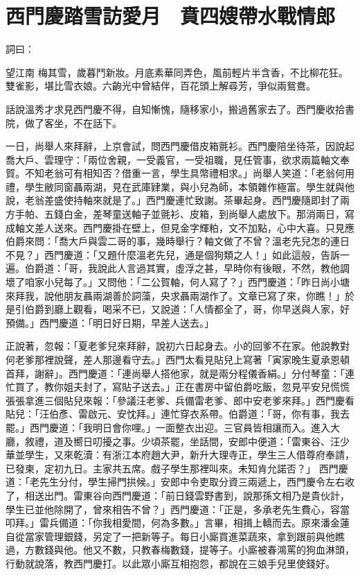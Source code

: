 %

\chapter{西門慶踏雪訪愛月　賁四嫂帶水戰情郎}

\begin{showcontents}{}


詞曰：

望江南
梅其雪，歲暮鬥新妝。月底素華同弄色，風前輕片半含香，不比柳花狂。
雙雀影，堪比雪衣娘。六齣光中曾結伴，百花頭上解尋芳，爭似兩鴛鴦。

話說溫秀才求見西門慶不得，自知慚愧，隨移家小，搬過舊家去了。西門慶收拾書院，做了客坐，不在話下。

一日，尚舉人來拜辭，上京會試，問西門慶借皮箱氈衫。西門慶陪坐待茶，因說起喬大戶、雲理守：「兩位舍親，一受義官，一受祖職，見任管事，欲求兩篇軸文奉賀。不知老翁可有相知否？借重一言，學生具幣禮相求。」尚舉人笑道：「老翁何用禮，學生敝同窗聶兩湖，見在武庫肄業，與小兒為師，本領雜作極富。學生就與他說，老翁差盛使持軸來就是了。」西門慶連忙致謝。茶畢起身。西門慶隨即封了兩方手帕、五錢白金，差琴童送軸子並氈衫、皮箱，到尚舉人處放下。那消兩日，寫成軸文差人送來。西門慶掛在壁上，但見金字輝粕，文不加點，心中大喜。只見應伯爵來問：「喬大戶與雲二哥的事，幾時舉行？軸文做了不曾？溫老先兒怎的連日不見？」西門慶道：「又題什麼溫老先兒，通是個狗類之人！」如此這般，告訴一遍。伯爵道：「哥，我說此人言過其實，虛浮之甚，早時你有後眼，不然，教他調壞了咱家小兒每了。」又問他：「二公賀軸，何人寫了？」西門慶道：「昨日尚小塘來拜我，說他朋友聶兩湖善於詞藻，央求聶兩湖作了。文章已寫了來，你瞧！」於是引伯爵到廳上觀看，喝采不已，又說道：「人情都全了，哥，你早送與人家，好預備。」西門慶道：「明日好日期，早差人送去。」

正說著，忽報：「夏老爹兒來拜辭，說初六日起身去。小的回爹不在家。他說教對何老爹那裡說聲，差人那邊看守去。」西門太看見貼兒上寫著「寅家晚生夏承恩頓首拜，謝辭」。西門慶道：「連尚舉人搭他家，就是兩分程儀香絹。」分付琴童：「連忙買了，教你姐夫封了，寫貼子送去。」正在書房中留伯爵吃飯，忽見平安兒慌慌張張拿進三個貼兒來報：「參議汪老爹、兵備雷老爹、郎中安老爹來拜。」西門慶看貼兒：「汪伯彥、雷啟元、安忱拜。」連忙穿衣系帶。伯爵道：「哥，你有事，我去罷。」西門慶道：「我明日會你哩。」一面整衣出迎。三官員皆相讓而入。進入大廳，敘禮，道及嚮日叨擾之事。少頃茶罷，坐話間，安郎中便道：「雷東谷、汪少華並學生，又來乾瀆：有浙江本府趙大尹，新升大理寺正，學生三人借尊府奉請，已發柬，定初九日。主家共五席。戲子學生那裡叫來。未知肯允諾否？」 西門慶道：「老先生分付，學生掃門拱候。」安郎中令吏取分資三兩遞上，西門慶令左右收了，相送出門。雷東谷向西門慶道：「前日錢雲野書到，說那孫文相乃是貴伙計，學生已並他除開了，曾來相告不曾？」西門慶道：「正是，多承老先生費心，容當叩拜。」雷兵備道：「你我相愛間，何為多數。」言畢，相揖上轎而去。原來潘金蓮自從當家管理銀錢，另定了一把新等子。每日小廝買進菜蔬來，拿到跟前與他瞧過，方數錢與他。他又不數，只教春梅數錢，提等子。小廝被春鴻罵的狗血淋頭，行動就說落，教西門慶打。以此眾小廝互相抱怨，都說在三娘手兒里使錢好。


\end{showcontents}
